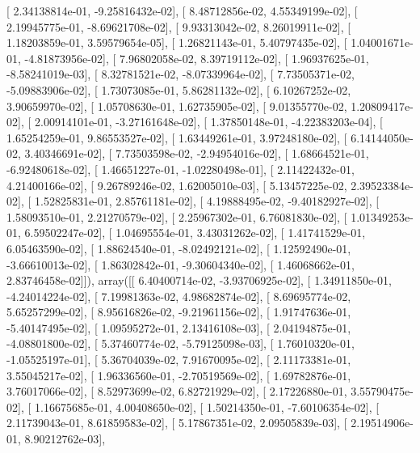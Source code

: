 \documentclass{article}
\begin{document}
       [  2.34138814e-01,  -9.25816432e-02],
       [  8.48712856e-02,   4.55349199e-02],
       [  2.19945775e-01,  -8.69621708e-02],
       [  9.93313042e-02,   8.26019911e-02],
       [  1.18203859e-01,   3.59579654e-05],
       [  1.26821143e-01,   5.40797435e-02],
       [  1.04001671e-01,  -4.81873956e-02],
       [  7.96802058e-02,   8.39719112e-02],
       [  1.96937625e-01,  -8.58241019e-03],
       [  8.32781521e-02,  -8.07339964e-02],
       [  7.73505371e-02,  -5.09883906e-02],
       [  1.73073085e-01,   5.86281132e-02],
       [  6.10267252e-02,   3.90659970e-02],
       [  1.05708630e-01,   1.62735905e-02],
       [  9.01355770e-02,   1.20809417e-02],
       [  2.00914101e-01,  -3.27161648e-02],
       [  1.37850148e-01,  -4.22383203e-04],
       [  1.65254259e-01,   9.86553527e-02],
       [  1.63449261e-01,   3.97248180e-02],
       [  6.14144050e-02,   3.40346691e-02],
       [  7.73503598e-02,  -2.94954016e-02],
       [  1.68664521e-01,  -6.92480618e-02],
       [  1.46651227e-01,  -1.02280498e-01],
       [  2.11422432e-01,   4.21400166e-02],
       [  9.26789246e-02,   1.62005010e-03],
       [  5.13457225e-02,   2.39523384e-02],
       [  1.52825831e-01,   2.85761181e-02],
       [  4.19888495e-02,  -9.40182927e-02],
       [  1.58093510e-01,   2.21270579e-02],
       [  2.25967302e-01,   6.76081830e-02],
       [  1.01349253e-01,   6.59502247e-02],
       [  1.04695554e-01,   3.43031262e-02],
       [  1.41741529e-01,   6.05463590e-02],
       [  1.88624540e-01,  -8.02492121e-02],
       [  1.12592490e-01,  -3.66610013e-02],
       [  1.86302842e-01,  -9.30604340e-02],
       [  1.46068662e-01,   2.83746458e-02]]), array([[  6.40400714e-02,  -3.93706925e-02],
       [  1.34911850e-01,  -4.24014224e-02],
       [  7.19981363e-02,   4.98682874e-02],
       [  8.69695774e-02,   5.65257299e-02],
       [  8.95616826e-02,  -9.21961156e-02],
       [  1.91747636e-01,  -5.40147495e-02],
       [  1.09595272e-01,   2.13416108e-03],
       [  2.04194875e-01,  -4.08801800e-02],
       [  5.37460774e-02,  -5.79125098e-03],
       [  1.76010320e-01,  -1.05525197e-01],
       [  5.36704039e-02,   7.91670095e-02],
       [  2.11173381e-01,   3.55045217e-02],
       [  1.96336560e-01,  -2.70519569e-02],
       [  1.69782876e-01,   3.76017066e-02],
       [  8.52973699e-02,   6.82721929e-02],
       [  2.17226880e-01,   3.55790475e-02],
       [  1.16675685e-01,   4.00408650e-02],
       [  1.50214350e-01,  -7.60106354e-02],
       [  2.11739043e-01,   8.61859583e-02],
       [  5.17867351e-02,   2.09505839e-03],
       [  2.19514906e-01,   8.90212762e-03],
\end{document}
